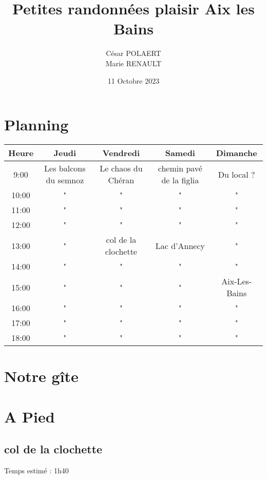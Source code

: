 \documentclass[12pt]{article}
\title{Petites randonnées plaisir Aix les Bains}
\author{César POLAERT\\Marie RENAULT}
\date{11 Octobre 2023}
\begin{document}
\maketitle

\newpage

\tableofcontents

\newpage

\section{Planning}

\begin{table}
    \centering
    \begin{tabular}{|c|c|c|c|c|}
      \hline
      \textbf{Heure} & \textbf{Jeudi} & \textbf{Vendredi} & \textbf{Samedi} & \textbf{Dimanche} \\
      \hline
      9:00 & Les balcons du semnoz & Le chaos du Chéran & chemin pavé de la figlia & Du local ?\\
      \hline
      10:00 & " & " & " & " \\
      \hline
      11:00 & " & " & " & " \\
      \hline
      12:00 & " & " & " & " \\
      \hline
      13:00 & " & col de la clochette & Lac d'Annecy & " \\
      \hline
      14:00 & " & " & " & " \\
      \hline
      15:00 & " & " & " & Aix-Les-Bains \\
      \hline
      16:00 & " & " & " & " \\
      \hline
      17:00 & " & " & " & " \\
      \hline
      18:00 & " & " & " & " \\
      \hline
    \end{tabular}
  \end{table}

\section{Notre gîte}

\section{A Pied}

\subsection{col de la clochette}
Temps estimé : 1h40
\end{document}
